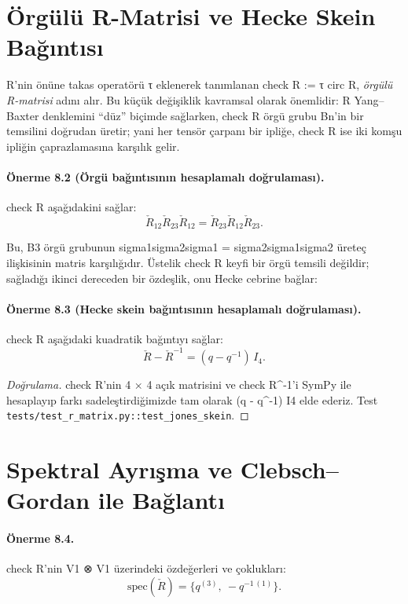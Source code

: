 \documentclass[12pt,a4paper]{report}
\numberwithin{equation}{chapter}
\theoremstyle{plain}
\theoremstyle{definition}
\begin{document}
\section{Örgülü R-Matrisi ve Hecke Skein Bağıntısı}

R'nin önüne takas operatörü τ eklenerek tanımlanan
check R := τ circ R, \emph{örgülü R-matrisi} adını alır. Bu küçük
değişiklik kavramsal olarak önemlidir: R Yang--Baxter denklemini ``düz''
biçimde sağlarken, check R örgü grubu Bn'in bir temsilini doğrudan üretir;
yani her tensör çarpanı bir ipliğe, check R ise iki komşu ipliğin
çaprazlamasına karşılık gelir.

\paragraph{Önerme 8.2 (Örgü bağıntısının hesaplamalı doğrulaması).}\label{thm:braid}
check R aşağıdakini sağlar:
\[
  \check R_{12} \check R_{23} \check R_{12} = \check R_{23} \check R_{12} \check R_{23}.
\]


Bu, B3 örgü grubunun sigma1sigma2sigma1 = sigma2sigma1sigma2
üreteç ilişkisinin matris karşılığıdır. Üstelik check R keyfi bir örgü
temsili değildir; sağladığı ikinci dereceden bir özdeşlik, onu Hecke cebrine
bağlar:

\paragraph{Önerme 8.3 (Hecke skein bağıntısının hesaplamalı doğrulaması).}\label{thm:hecke}
check R aşağıdaki kuadratik bağıntıyı sağlar:
\[
  \check R - \check R^{-1} = (q - q^{-1})\, I_4.
\]


\begin{proof}[Doğrulama]
check R'nin 4 × 4 açık matrisini ve check R^-1'i SymPy
ile hesaplayıp farkı sadeleştirdiğimizde tam olarak
(q - q^-1) I4 elde ederiz. Test
\texttt{tests/test\_r\_matrix.py::test\_jones\_skein}.
\end{proof}

\section{Spektral Ayrışma ve Clebsch--Gordan ile Bağlantı}

\paragraph{Önerme 8.4.}\label{prop:eigs}
check R'nin V1 ⊗ V1 üzerindeki özdeğerleri ve çoklukları:
\[
  \mathrm{spec}(\check R) = \{q^{(3)},\ -q^{-1\,(1)}\}.
\]
\end{document}

